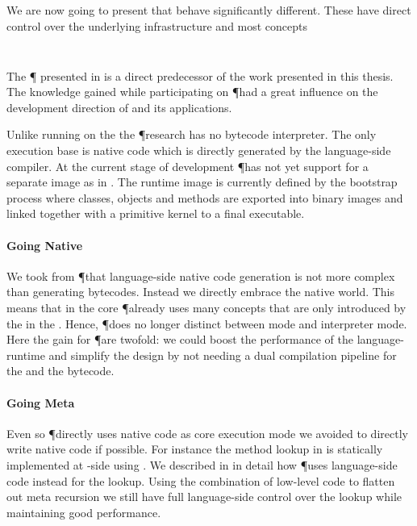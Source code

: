We are now going to present \VMs that behave significantly different.
These \VMs have direct control over the underlying infrastructure and most concepts
\\
 \\


\subsubsection*{\Pinocchio \VM}

The \P \VM \cite{Verw11a} presented in  is a direct predecessor of the work presented in this thesis.
The knowledge gained while participating on \P had a great influence on the development direction of \B and its applications.

Unlike \PH running on the \Cog \VM the \P research \VM has no bytecode interpreter.
The only execution base is native code which is directly generated by the language-side compiler.
At the current stage of development \P has not yet support for a separate image as in \PH.
The runtime image is currently defined by the bootstrap process where classes, objects and methods are exported into binary images and linked together with a primitive kernel to a final executable.

\paragraph{Going Native}
We took from \P that language-side native code generation is not more complex than generating bytecodes.
Instead we directly embrace the native world.
This means that in the core \P already uses many concepts that are only introduced by the \JIT in the \Cog \VM.
Hence, \P does no longer distinct between \JIT mode and interpreter mode.
Here the gain for \P are twofold: we could boost the performance of the language-runtime and simplify the design by not needing a dual compilation pipeline for the \JIT and the bytecode.

\paragraph{Going Meta}
Even so \P directly uses native code as core execution mode we avoided to directly write native code if possible.
For instance the method lookup in \Cog is statically implemented at \VM-side using \Slang.
We described in  in detail how \P uses language-side code instead for the lookup.
Using the combination of low-level code to flatten out meta recursion we still have full language-side control over the lookup while maintaining good performance.

